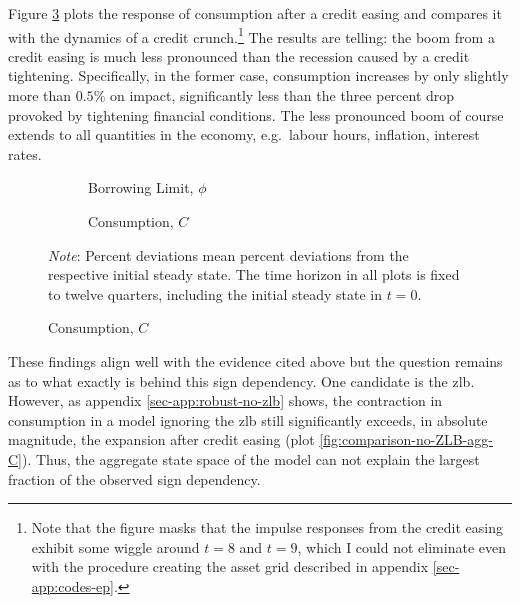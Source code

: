\documentclass[a4paper,12pt]{article} %
\numberwithin{equation}{section} %
\numberwithin{figure}{section}
\numberwithin{table}{section}
\begin{document}
Figure \ref{fig:comparison-asymmetry-C} plots the response of consumption after a credit easing and compares it with the dynamics of a credit crunch.\footnote{Note that the figure masks that the impulse responses from the credit easing exhibit some wiggle around $t=8$ and $t=9$, which I could not eliminate even with the procedure creating the asset grid described in appendix \ref{sec-app:codes-ep}.} The results are telling: the boom from a credit easing is much less pronounced than the recession caused by a credit tightening. Specifically, in the former case, consumption increases by only slightly more than $0.5\%$ on impact, significantly less than the three percent drop provoked by tightening financial conditions. The less pronounced boom of course extends to all quantities in the economy, e.g.~labour hours, inflation, interest rates.

\begin{figure}[t]
    \caption{Baseline Model -- Shock to Borrowing Limit: Asymmetry}
    \label{fig:comparison-asymmetry}
    \centering
    \begin{subfigure}[b]{0.49\textwidth}
    \caption{Borrowing Limit, $\phi$}
    \label{fig:comparison-asymmetry-phi}
         \centering
         
     \end{subfigure}
    \hfill
    \begin{subfigure}[b]{0.49\textwidth}
    \caption{Consumption, $C$}
    \label{fig:comparison-asymmetry-C}
         \centering
         
     \end{subfigure}
     
     \vspace{10pt}
     
     \justifying
     \footnotesize
	\textit{Note}: Percent deviations mean percent deviations from the respective initial steady state. The time horizon in all plots is fixed to twelve quarters, including the initial steady state in $t=0$.
\end{figure}

These findings align well with the evidence cited above but the question remains as to what exactly is behind this sign dependency. One candidate is the \Gls{zlb}. However, as appendix \ref{sec-app:robust-no-zlb} shows, the contraction in consumption in a model ignoring the \Gls{zlb} still significantly exceeds, in absolute magnitude, the expansion after credit easing (plot \ref{fig:comparison-no-ZLB-agg-C}). Thus, the aggregate state space of the model can not explain the largest fraction of the observed sign dependency.
\end{document}
